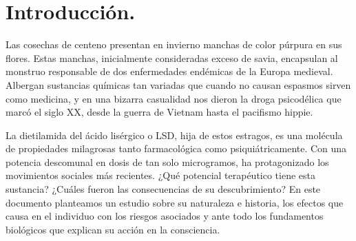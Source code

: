 \section{Introducción.}

Las cosechas de centeno presentan en invierno manchas de color púrpura en sus flores. Estas manchas, inicialmente consideradas exceso de savia, encapsulan al monstruo responsable de dos enfermedades endémicas de la Europa medieval. Albergan sustancias químicas tan variadas que cuando no causan espasmos sirven como medicina, y en una bizarra casualidad nos dieron la droga psicodélica que marcó el siglo XX, desde la guerra de Vietnam hasta el pacifismo hippie.

La dietilamida del ácido lisérgico o LSD, hija de estos estragos, es una molécula de propiedades milagrosas tanto farmacológica como psiquiátricamente. Con una potencia descomunal en dosis de tan solo microgramos, ha protagonizado los movimientos sociales más recientes. ¿Qué potencial terapéutico tiene esta sustancia? ¿Cuáles fueron las consecuencias de su descubrimiento? En este documento planteamos un estudio sobre su naturaleza e historia, los efectos que causa en el individuo con los riesgos asociados y ante todo los fundamentos biológicos que explican su acción en la consciencia.

\newpage
